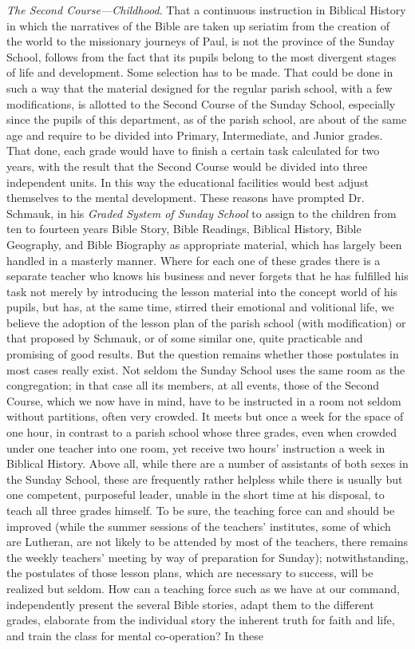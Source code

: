 \emph{The Second Course—Childhood}. That a continuous instruction in Biblical History in which the narratives of the Bible are taken up seriatim from the creation of the world to the missionary journeys of Paul, is not the province of the Sunday School, follows from the fact that its pupils belong to the most divergent stages of life and development. Some selection has to be made. That could be done in such a way that the material designed for the regular parish school, with a few modifications, is allotted to the Second Course of the Sunday School, especially since the pupils of this department, as of the parish school, are about of the same age and require to be divided into Primary, Intermediate, and Junior grades. That done, each grade would have to finish a certain task calculated for two years, with the result that the Second Course would be divided into three independent units. In this way the educational facilities would best adjust themselves to the mental development. These reasons have prompted Dr. Schmauk, in his \emph{Graded System of Sunday School} to assign to the children from ten to fourteen years Bible Story, Bible Readings, Biblical History, Bible Geography, and Bible
Biography as appropriate material, which has largely been handled in a masterly manner. Where for each one of these grades there is a separate teacher who knows his business and never forgets that he has fulfilled his task not merely by introducing the lesson material into the concept world of his pupils, but has, at the same time, stirred their emotional and volitional life, we believe the adoption of the lesson plan of the parish school (with modification) or that proposed by Schmauk, or of some similar one, quite practicable and promising of good results. But the question remains whether those postulates in most cases really exist. Not seldom the Sunday School uses the same room as the congregation; in that case all its members, at all events, those of the Second Course, which we now have in mind, have to be instructed in a room not seldom without partitions, often very crowded. It meets but once a week for the space of one hour, in contrast to a parish school whose three grades, even when crowded under one teacher into one room, yet receive two hours’ instruction a week in Biblical History. Above all, while there are a number of assistants of both sexes in the Sunday School, these are frequently rather helpless while there is usually but one competent, purposeful leader, unable in the short time at his disposal, to teach all three grades himself. To be sure, the teaching force can and should be improved (while the summer sessions of the teachers’ institutes, some of which are Lutheran, are not likely to be attended by most of the teachers, there remains the weekly teachers’ meeting by way of preparation for Sunday); notwithstanding, the postulates of those lesson plans, which are necessary to success, will be realized but seldom. How can a teaching force such as we have at our command, independently present the several Bible stories, adapt them to the different grades, elaborate from the individual story the inherent truth for faith and life, and train the class for mental co-operation? In these
